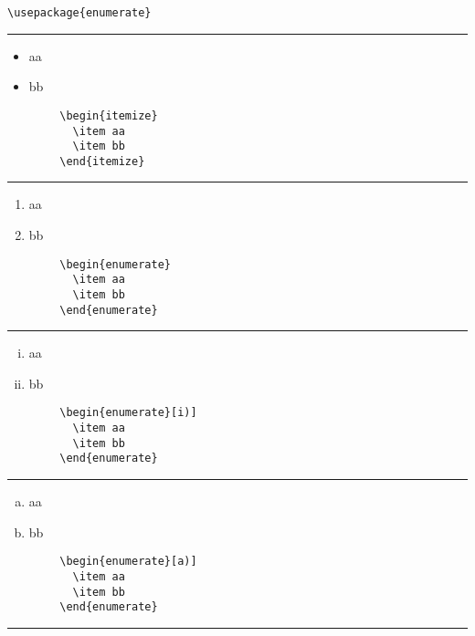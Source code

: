 \documentclass[a4paper,10pt,landscape]{article}
\newcommand{\hSep}{{\color{colorSep}\hrule}}
\theoremstyle{definition}
\theoremstyle{remark}
\begin{document}
\begin{multicols}{3}
\verb!\usepackage{enumerate}!
\hSep
\begin{multicols}{2}
		\begin{itemize}
		  \item aa
		  \item bb
		\end{itemize}
\columnbreak
	\begin{verbatim}
		\begin{itemize}
		  \item aa
		  \item bb
		\end{itemize}
	\end{verbatim}
\end{multicols}
\hSep
\begin{multicols}{2}
		\begin{enumerate}
		  \item aa
		  \item bb
		\end{enumerate}
\columnbreak
	\begin{verbatim}
		\begin{enumerate}
		  \item aa
		  \item bb
		\end{enumerate}
	\end{verbatim}
\end{multicols}
\hSep
\begin{multicols}{2}
		\begin{enumerate}[i)]
		  \item aa
		  \item bb
		\end{enumerate}
\columnbreak
	\begin{verbatim}
		\begin{enumerate}[i)]
		  \item aa
		  \item bb
		\end{enumerate}
	\end{verbatim}
\end{multicols}
\hSep
\begin{multicols}{2}
		\begin{enumerate}[a)]
		  \item aa
		  \item bb
		\end{enumerate}
\columnbreak
	\begin{verbatim}
		\begin{enumerate}[a)]
		  \item aa
		  \item bb
		\end{enumerate}
	\end{verbatim}
\end{multicols}
\hSep




\end{multicols} %





\end{document}
